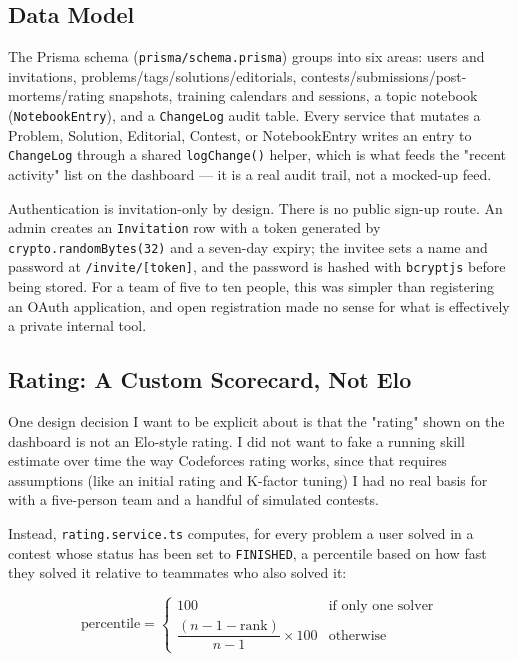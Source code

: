 \documentclass[11pt]{article}
\begin{document}
\subsection{Data Model}

The Prisma schema (\texttt{prisma/schema.prisma}) groups into six areas: users and invitations, problems/tags/solutions/editorials, contests/submissions/post-mortems/rating snapshots, training calendars and sessions, a topic notebook (\texttt{NotebookEntry}), and a \texttt{ChangeLog} audit table. Every service that mutates a Problem, Solution, Editorial, Contest, or NotebookEntry writes an entry to \texttt{ChangeLog} through a shared \texttt{logChange()} helper, which is what feeds the "recent activity" list on the dashboard --- it is a real audit trail, not a mocked-up feed.

Authentication is invitation-only by design. There is no public sign-up route. An admin creates an \texttt{Invitation} row with a token generated by \texttt{crypto.randomBytes(32)} and a seven-day expiry; the invitee sets a name and password at \texttt{/invite/[token]}, and the password is hashed with \texttt{bcryptjs} before being stored. For a team of five to ten people, this was simpler than registering an OAuth application, and open registration made no sense for what is effectively a private internal tool.

\subsection{Rating: A Custom Scorecard, Not Elo}

One design decision I want to be explicit about is that the "rating" shown on the dashboard is not an Elo-style rating. I did not want to fake a running skill estimate over time the way Codeforces rating works, since that requires assumptions (like an initial rating and K-factor tuning) I had no real basis for with a five-person team and a handful of simulated contests.

Instead, \texttt{rating.service.ts} computes, for every problem a user solved in a contest whose status has been set to \texttt{FINISHED}, a percentile based on how fast they solved it relative to teammates who also solved it:

\[
\text{percentile} =
\begin{cases}
100 & \text{if only one solver} \\[4pt]
\dfrac{(n - 1 - \text{rank})}{n - 1} \times 100 & \text{otherwise}
\end{cases}
\]
\end{document}
